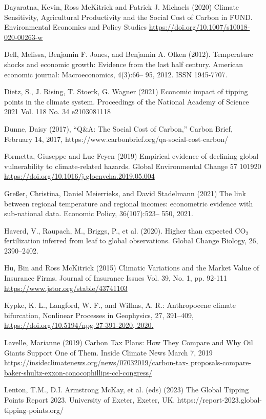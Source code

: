\documentclass[12pt,paper=a4,DIV=12,parskip=never,chapterprefix=false,headings=standardclasses]{scrreprt}
\begin{document}
Dayaratna, Kevin, Ross McKitrick and Patrick J. Michaels (2020) Climate Sensitivity, Agricultural
Productivity and the Social Cost of Carbon in FUND. Environmental Economics and Policy Studies
\url{https://doi.org/10.1007/s10018-020-00263-w}

Dell, Melissa, Benjamin F. Jones, and Benjamin A. Olken (2012). Temperature shocks and economic
growth: Evidence from the last half century. American economic journal: Macroeconomics, 4(3):66–
95, 2012. ISSN 1945-7707.

Dietz, S., J. Rising, T. Stoerk, G. Wagner (2021) Economic impact of tipping points in the climate system.
Proceedings of the National Academy of Science 2021 Vol. 118 No. 34 e2103081118

Dunne, Daisy (2017), “Q\&A: The Social Cost of Carbon,” Carbon Brief, February 14, 2017,
https://www.carbonbrief.org/qa-social-cost-carbon/

Formetta, Giuseppe and Luc Feyen (2019) Empirical evidence of declining global vulnerability to
climate-related hazards. Global Environmental Change 57 101920
\url{https://doi.org/10.1016/j.gloenvcha.2019.05.004}

Greßer, Christina, Daniel Meierrieks, and David Stadelmann (2021) The link between regional temperature
and regional incomes: econometric evidence with sub-national data. Economic Policy, 36(107):523–
550, 2021.

Haverd, V., Raupach, M., Briggs, P., et al. (2020). Higher than expected CO$_2$ fertilization inferred from leaf to global observations. Global Change Biology, 26, 2390–2402.

Hu, Bin and Ross McKitrick (2015) Climatic Variations and the Market Value of Insurance Firms.
Journal of Insurance Issues Vol. 39, No. 1, pp. 92-111 \url{https://www.jstor.org/stable/43741103}

Kypke, K. L., Langford, W. F., and Willms, A. R.: Anthropocene climate bifurcation, Nonlinear Processes
in Geophysics, 27, 391–409, \url{https://doi.org/10.5194/npg-27-391-2020, 2020.}

Lavelle, Marianne (2019) Carbon Tax Plans: How They Compare and Why Oil Giants Support One of
Them. Inside Climate News March 7, 2019 \url{https://insideclimatenews.org/news/07032019/carbon-tax-
proposals-compare-baker-shultz-exxon-conocophillips-ccl-congress/}

Lenton, T.M., D.I. Armstrong McKay, et al. (eds) (2023) The Global Tipping Points Report 2023.
University of Exeter, Exeter, UK. https://report-2023.global-tipping-points.org/
\end{document}
